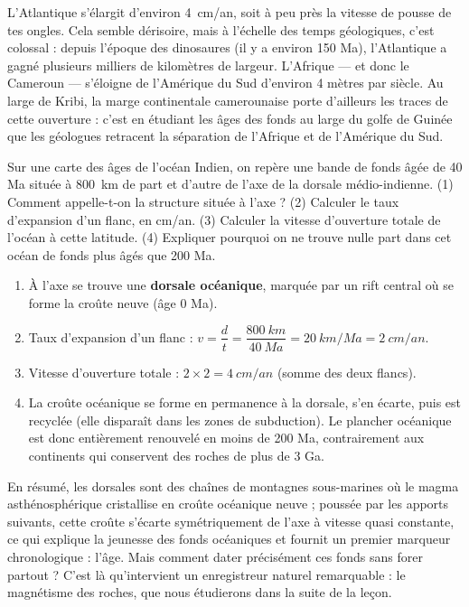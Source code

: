 \documentclass[11pt]{article}
\begin{document}
\begin{savaistu}
L'Atlantique s'élargit d'environ \SI{4}{cm/an}, soit à peu près la vitesse de pousse de tes ongles. Cela semble dérisoire, mais à l'échelle des temps géologiques, c'est colossal : depuis l'époque des dinosaures (il y a environ 150 Ma), l'Atlantique a gagné plusieurs milliers de kilomètres de largeur. L'Afrique — et donc le Cameroun — s'éloigne de l'Amérique du Sud d'environ 4 mètres par siècle. Au large de Kribi, la marge continentale camerounaise porte d'ailleurs les traces de cette ouverture : c'est en étudiant les âges des fonds au large du golfe de Guinée que les géologues retracent la séparation de l'Afrique et de l'Amérique du Sud.
\end{savaistu}

\begin{exercice}
Sur une carte des âges de l'océan Indien, on repère une bande de fonds âgée de 40 Ma située à \SI{800}{km} de part et d'autre de l'axe de la dorsale médio-indienne. (1) Comment appelle-t-on la structure située à l'axe ? (2) Calculer le taux d'expansion d'un flanc, en cm/an. (3) Calculer la vitesse d'ouverture totale de l'océan à cette latitude. (4) Expliquer pourquoi on ne trouve nulle part dans cet océan de fonds plus âgés que 200 Ma.
\end{exercice}

\begin{corrige}
\begin{enumerate}
\item À l'axe se trouve une \textbf{dorsale océanique}, marquée par un rift central où se forme la croûte neuve (âge 0 Ma).
\item Taux d'expansion d'un flanc : $v = \dfrac{d}{t} = \dfrac{\SI{800}{km}}{\SI{40}{Ma}} = \SI{20}{km/Ma} = \SI{2}{cm/an}$.
\item Vitesse d'ouverture totale : $2 \times 2 = \SI{4}{cm/an}$ (somme des deux flancs).
\item La croûte océanique se forme en permanence à la dorsale, s'en écarte, puis est recyclée (elle disparaît dans les zones de subduction). Le plancher océanique est donc entièrement renouvelé en moins de 200 Ma, contrairement aux continents qui conservent des roches de plus de 3 Ga.
\end{enumerate}
\end{corrige}

En résumé, les dorsales sont des chaînes de montagnes sous-marines où le magma asthénosphérique cristallise en croûte océanique neuve ; poussée par les apports suivants, cette croûte s'écarte symétriquement de l'axe à vitesse quasi constante, ce qui explique la jeunesse des fonds océaniques et fournit un premier marqueur chronologique : l'âge. Mais comment dater précisément ces fonds sans forer partout ? C'est là qu'intervient un enregistreur naturel remarquable : le magnétisme des roches, que nous étudierons dans la suite de la leçon.
\end{document}
